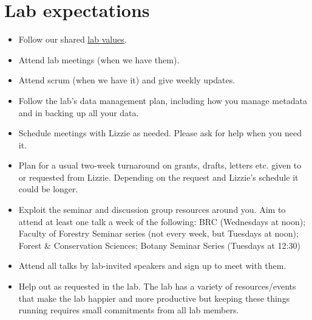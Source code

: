 \documentclass[11pt,a4paper,oneside]{article}
\begin{document}
\section{Lab expectations}
\begin{itemize}
\item Follow our shared \href{https://github.com/temporalecologylab/labgit/blob/master/expectations/values_aspirations.pdf}{lab values}.
\item Attend lab meetings (when we have them). %
\item Attend scrum (when we have it) and give weekly updates. 
\item Follow the lab's data management plan, including how you manage metadata and in backing up all your data.
\item Schedule meetings with Lizzie as needed. Please ask for help when you need it.
\item Plan for a usual two-week turnaround on grants, drafts, letters etc. given to or requested from Lizzie. Depending on the request and Lizzie's schedule it could be longer.  
\item Exploit the seminar and discussion group resources around you. Aim to attend at least one talk a week of the following: BRC (Wednesdays at noon); Faculty of Forestry Seminar series (not every week, but Tuesdays at noon); Forest \& Conservation Sciences; Botany Seminar Series (Tuesdays at 12:30)
\item Attend all talks by lab-invited speakers and sign up to meet with them. 
\item Help out as requested in the lab. The lab has a variety of resources/events that make the lab happier and more productive but keeping these things running requires small commitments from all lab members. 


\end{itemize}
\end{document}
